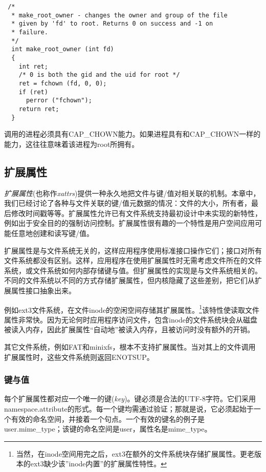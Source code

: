 \begin{lstlisting}
 /*
  * make_root_owner - changes the owner and group of the file
  * given by 'fd' to root. Returns 0 on success and -1 on
  * failure.
  */
  int make_root_owner (int fd)
  {
    int ret;
    /* 0 is both the gid and the uid for root */
    ret = fchown (fd, 0, 0);
    if (ret)
      perror ("fchown");
    return ret;
  }
\end{lstlisting}

调用的进程必须具有CAP\_CHOWN能力。如果进程具有和CAP\_CHOWN一样的能力，这往往意味着该进程为root所拥有。

\subsection{扩展属性}

\emph{扩展属性}(也称作\emph{xattrs})提供一种永久地把文件与键/值对相关联的机制。本章中，我们已经讨论了各种与文件关联的键/值元数据的情况：文件的大小，所有者，最后修改时间戳等等。扩展属性允许已有文件系统支持最初设计中未实现的新特性，例如出于安全目的的强制访问控制。扩展属性很有趣的一个特性是用户空间应用可能任意地创建和读写键/值。

扩展属性是与文件系统无关的，这样应用程序使用标准接口操作它们；接口对所有文件系统都没有区别。这样，应用程序在使用扩展属性时无需考虑文件所在的文件系统，或文件系统如何内部存储键与值。但扩展属性的实现是与文件系统相关的。不同的文件系统以不同的方式存储扩展属性，但内核隐藏了这些差别，把它们从扩展属性接口抽象出来。

例如ext3文件系统，在文件inode的空闲空间存储其扩展属性。\footnote[1]{当然，在inode空间用完之后，ext3在额外的文件系统块存储扩展属性。更老版本的ext3缺少该''inode内置''的扩展属性特性。}该特性使读取文件属性非常快。因为无论何时应用程序访问文件，包含inode的文件系统块会从磁盘被读入内存，因此扩展属性“自动地”被读入内存，且被访问时没有额外的开销。

其它文件系统，例如FAT和minixfs，根本不支持扩展属性。当对其上的文件调用扩展属性时，这些文件系统则返回ENOTSUP。

\subsubsection{键与值}

每个扩展属性都对应一个唯一的键(\emph{key})。键必须是合法的UTF-8字符。它们采用namespace.attribute的形式。每一个键均需通过验证；那就是说，它必须起始于一个有效的命名空间，并接着一个句点。一个有效的键名的例子是user.mime\_type；该键的命名空间是user，属性名是mime\_type。

